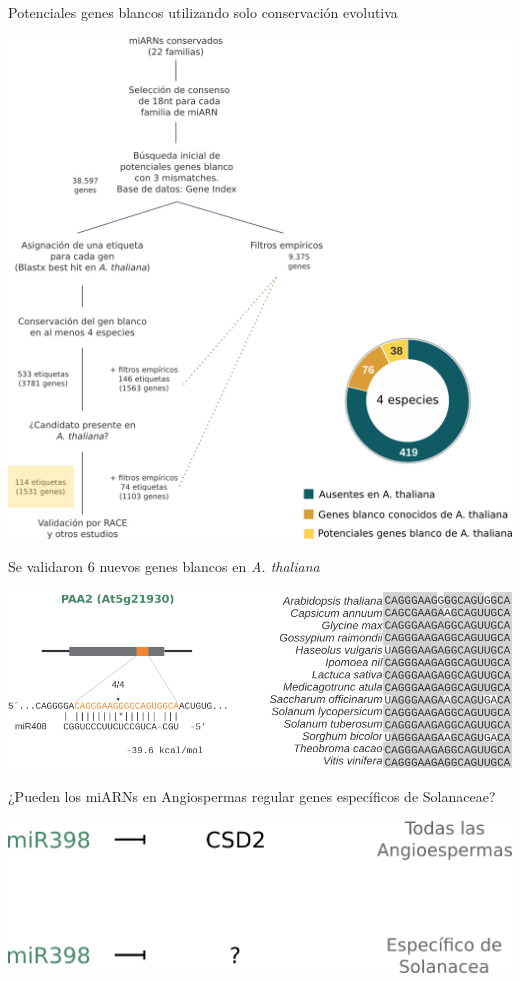 \documentclass{beamer}
\begin{document}
\begin{frame}{Potenciales genes blancos utilizando solo conservación evolutiva}
	\begin{center}
		\includegraphics[width=.7\textwidth]{img/NAR_fig01y03.png}
	\end{center}
\end{frame}

\begin{frame}{Se validaron 6 nuevos genes blancos en \textit{A. thaliana}}
	\begin{center}
		\includegraphics[width=1\textwidth]{img/Figure4_retocada_nueva01.png}
	\end{center}
\end{frame}



\begin{frame}{¿Pueden los miARNs en Angiospermas regular genes específicos de Solanaceae?}
	\begin{center}
		\includegraphics[width=.8\textwidth]{img/miR398_solanaceae.png}
	\end{center}
\end{frame}
\end{document}
